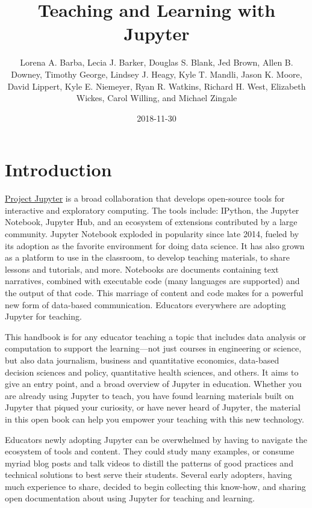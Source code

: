 \documentclass[]{book}
\title{Teaching and Learning with Jupyter}
\author{Lorena A. Barba, Lecia J. Barker, Douglas S. Blank, Jed Brown, Allen B.
Downey, Timothy George, Lindsey J. Heagy, Kyle T. Mandli, Jason K.
Moore, David Lippert, Kyle E. Niemeyer, Ryan R. Watkins, Richard H.
West, Elizabeth Wickes, Carol Willing, and Michael Zingale}
\date{2018-11-30}
\begin{document}
\maketitle

{
\setcounter{tocdepth}{1}
\tableofcontents
}
\chapter{Introduction}\label{intro}

\href{http://jupyter.org/}{Project Jupyter} is a broad collaboration
that develops open-source tools for interactive and exploratory
computing. The tools include: IPython, the Jupyter Notebook, Jupyter
Hub, and an ecosystem of extensions contributed by a large community.
Jupyter Notebook exploded in popularity since late 2014, fueled by its
adoption as the favorite environment for doing data science. It has also
grown as a platform to use in the classroom, to develop teaching
materials, to share lessons and tutorials, and more. Notebooks are
documents containing text narratives, combined with executable code
(many languages are supported) and the output of that code. This
marriage of content and code makes for a powerful new form of data-based
communication. Educators everywhere are adopting Jupyter for teaching.

This handbook is for any educator teaching a topic that includes data
analysis or computation to support the learning---not just courses in
engineering or science, but also data journalism, business and
quantitative economics, data-based decision sciences and policy,
quantitative health sciences, and others. It aims to give an entry
point, and a broad overview of Jupyter in education. Whether you are
already using Jupyter to teach, you have found learning materials built
on Jupyter that piqued your curiosity, or have never heard of Jupyter,
the material in this open book can help you empower your teaching with
this new technology.

Educators newly adopting Jupyter can be overwhelmed by having to
navigate the ecosystem of tools and content. They could study many
examples, or consume myriad blog posts and talk videos to distill the
patterns of good practices and technical solutions to best serve their
students. Several early adopters, having much experience to share,
decided to begin collecting this know-how, and sharing open
documentation about using Jupyter for teaching and learning.
\end{document}
